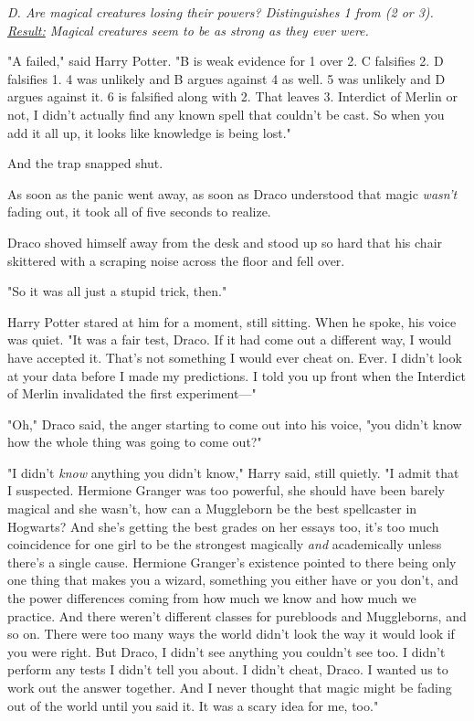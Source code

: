 \emph{D. Are magical creatures losing their powers? Distinguishes 1 from (2 or 
3). \underline{Result:} Magical creatures seem to be as strong as they ever 
were.}

"A failed," said Harry Potter. "B is weak evidence for 1 over 2. C falsifies 2. 
D falsifies 1. 4 was unlikely and B argues against 4 as well. 5 was unlikely 
and D argues against it. 6 is falsified along with 2. That leaves 3. Interdict 
of Merlin or not, I didn't actually find any known spell that couldn't be cast. 
So when you add it all up, it looks like knowledge is being lost."

And the trap snapped shut.

As soon as the panic went away, as soon as Draco understood that magic 
\emph{wasn't} fading out, it took all of five seconds to realize.

Draco shoved himself away from the desk and stood up so hard that his chair 
skittered with a scraping noise across the floor and fell over.

"So it was all just a stupid trick, then."

Harry Potter stared at him for a moment, still sitting. When he spoke, his 
voice was quiet. "It was a fair test, Draco. If it had come out a different 
way, I would have accepted it. That's not something I would ever cheat on. 
Ever. I didn't look at your data before I made my predictions. I told you up 
front when the Interdict of Merlin invalidated the first experiment---"

"Oh," Draco said, the anger starting to come out into his voice, "you didn't 
know how the whole thing was going to come out?"

"I didn't \emph{know} anything you didn't know," Harry said, still quietly. "I 
admit that I suspected. Hermione Granger was too powerful, she should have been 
barely magical and she wasn't, how can a Muggleborn be the best spellcaster in 
Hogwarts? And she's getting the best grades on her essays too, it's too much 
coincidence for one girl to be the strongest magically \emph{and} academically 
unless there's a single cause. Hermione Granger's existence pointed to there 
being only one thing that makes you a wizard, something you either have or you 
don't, and the power differences coming from how much we know and how much we 
practice. And there weren't different classes for purebloods and Muggleborns, 
and so on. There were too many ways the world didn't look the way it would look 
if you were right. But Draco, I didn't see anything you couldn't see too. I 
didn't perform any tests I didn't tell you about. I didn't cheat, Draco. I 
wanted us to work out the answer together. And I never thought that magic might 
be fading out of the world until you said it. It was a scary idea for me, too."

